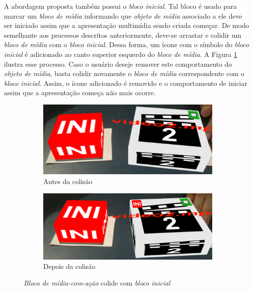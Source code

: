 \documentclass[../main.tex]{subfiles}
\begin{document}
A abordagem proposta também possui o \emph{bloco inicial}. Tal bloco é usado para marcar um \emph{bloco de mídia} informando que \emph{objeto de mídia} associado a ele deve ser iniciado assim que a apresentação multimídia sendo criada começar. De modo semelhante aos processos descritos anteriormente, deve-se arrastar e colidir um \emph{bloco de mídia} com o \emph{bloco inicial}. Dessa forma, um ícone com o símbolo do \emph{bloco inicial} é adicionado ao canto superior esquerdo do \emph{bloco de mídia}. A Figura \ref{fig:inicial} ilustra esse processo. Caso o usuário deseje remover este comportamento do \emph{objeto de mídia}, basta colidir novamente o \emph{bloco de mídia} correspondente com o \emph{bloco inicial}. Assim, o ícone adicionado é removido e o comportamento de iniciar assim que a apresentação começa não mais ocorre.

\begin{figure}[!h]
  \begin{subfigure}{0.49\linewidth}
    \includegraphics[width=0.95\linewidth]{IMG/beforeINIR.png}
    \caption{Antes da colisão}
  \end{subfigure}
  \begin{subfigure}{0.49\linewidth}
    \includegraphics[width=0.95\linewidth]{IMG/afterINIR.png}
    \caption{Depois da colisão}
  \end{subfigure}
\caption{\textit{Bloco de mídia-com-ação} colide com \textit{bloco inicial}}
\label{fig:inicial}
\end{figure}
\end{document}
